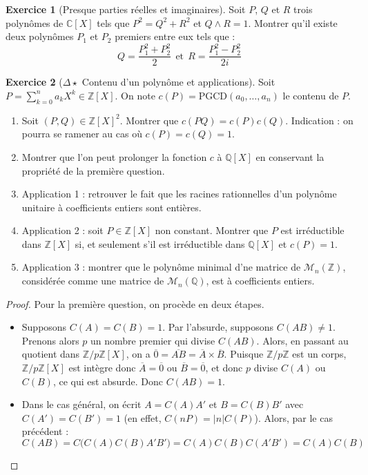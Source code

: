 \documentclass[french]{book}
\newcommand{\Z}{\mathbb{Z}}
\newcommand{\Q}{\mathbb{Q}}
\newcommand{\C}{\mathbb{C}}
\theoremstyle{definition}
\newtheorem{ex}{Exercice}[chapter]
\theoremstyle{theorem}
\theoremstyle{remark}
\begin{document}
\begin{ex}[Presque parties réelles et imaginaires]
	Soit $P$, $Q$ et $R$ trois polynômes de $\C[X]$ tels que $P^2=Q^2+R^2$ et $Q\wedge R=1$. Montrer qu'il existe deux polynômes $P_1$ et $P_2$ premiers entre eux tels que : $$Q=\frac{P_1^2+P_2^2}{2}\ \ \text{et}\ \ R=\frac{P_1^2-P_2^2}{2i}$$
\end{ex}

\begin{ex}[$\Delta\star$ Contenu d'un polynôme et applications]
	Soit $P=\displaystyle\sum_{k=0}^{n}a_kX^k\in\Z[X]$. On note $c(P)=\text{PGCD}(a_0,\ldots,a_n)$ le contenu de $P$.
	\begin{enumerate}
		\item Soit $(P,Q)\in\Z[X]^2$. Montrer que $c(PQ)=c(P)c(Q)$. Indication : on pourra se ramener au cas où $c(P)=c(Q)=1$.
		\item Montrer que l'on peut prolonger la fonction $c$ à $\Q[X]$ en conservant la propriété de la première question.
		\item Application 1 : retrouver le fait que les racines rationnelles d'un polynôme unitaire à coefficients entiers sont entières.
		\item Application 2 : soit $P\in\Z[X]$ non constant. Montrer que $P$ est irréductible dans $\Z[X]$ si, et seulement s'il est irréductible dans $\Q[X]$ et $c(P)=1$.
		\item Application 3 : montrer que le polynôme minimal d'ne matrice de $\mathcal{M}_n(\Z)$, considérée comme une matrice de $\mathcal{M}_n(\Q)$, est à coefficients entiers.
	\end{enumerate}
\end{ex}

\begin{proof}
	Pour la première question, on procède en deux étapes.
	\begin{itemize}
		\item Supposons $C(A)=C(B)=1$. Par l'absurde, supposons $C(AB)\ne 1$. Prenons alors $p$ un nombre premier qui divise $C(AB)$. Alors, en passant au quotient dans $\Z/p\Z[X]$, on a $\overline{0}=\overline{AB}=\overline{A}\times\overline{B}$. Puisque $\Z/p\Z$ est un corps, $\Z/p\Z[X]$ est intègre donc $\overline{A}=\overline{0}$ ou $\overline{B}=\overline{0}$, et donc $p$ divise $C(A)$ ou $C(B)$, ce qui est absurde. Donc $C(AB)=1$.
		\item Dans le cas général, on écrit $A=C(A)A'$ et $B=C(B)B'$ avec $C(A')=C(B')=1$ (en effet, $C(nP)=\lvert n\rvert C(P)$). Alors, par le cas précédent : $$C(AB)=C\big(C(A)C(B)A'B'\big)=C(A)C(B)C(A'B')=C(A)C(B)$$
	\end{itemize}
\end{proof}
\end{document}
